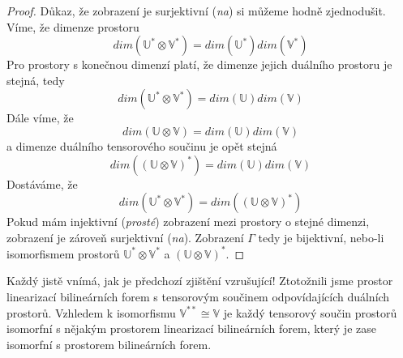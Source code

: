\documentclass[a5paper,12pt]{amsbook}
\theoremstyle{definition}
\newcommand{\myspace}[1]{\mathbb{#1}}
\begin{document}
\begin{proof}
\medskip\noindent
Důkaz, že zobrazení je surjektivní (\textit{na}) si můžeme hodně zjednodušit. Víme, že dimenze
prostoru
\begin{equation*}
dim(\myspace{U^*}\otimes\myspace{V^*}) = dim(\myspace{U^*})dim(\myspace{V^*})
\end{equation*}
Pro prostory s konečnou dimenzí platí, že dimenze jejich duálního prostoru je stejná, tedy
\begin{equation*}
dim(\myspace{U^*}\otimes\myspace{V^*}) = dim(\myspace{U})dim(\myspace{V})
\end{equation*}
Dále víme, že
\begin{equation*}
dim(\myspace{U}\otimes\myspace{V}) = dim(\myspace{U})dim(\myspace{V})
\end{equation*}
a dimenze duálního tensorového součinu je opět stejná
\begin{equation*}
dim((\myspace{U}\otimes\myspace{V})^*) = dim(\myspace{U})dim(\myspace{V})
\end{equation*}
Dostáváme, že
\begin{equation*}
dim(\myspace{U^*}\otimes\myspace{V^*}) = dim((\myspace{U}\otimes\myspace{V})^*)
\end{equation*}
Pokud mám injektivní (\textit{prosté}) zobrazení mezi prostory o stejné dimenzi, zobrazení je
zároveň surjektivní (\textit{na}). Zobrazení $\Gamma$ tedy je bijektivní, nebo-li isomorfismem
prostorů $\myspace{U^*}\otimes\myspace{V^*}$ a $(\myspace{U}\otimes\myspace{V})^*$.
\end{proof}

\noindent
Každý jistě vnímá, jak je předchozí zjištění vzrušující! Ztotožnili jsme prostor linearizací
bilineárních forem s tensorovým součinem odpovídajících duálních prostorů. Vzhledem k isomorfismu
$\myspace{V^{**}}\cong\myspace{V}$ je každý tensorový součin prostorů isomorfní s nějakým prostorem
linearizací bilineárních forem, který je zase isomorfní s prostorem bilineárních forem.
\end{document}
